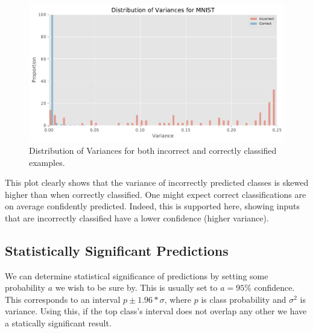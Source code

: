 \documentclass{article}
\begin{document}
\begin{figure}[hbt]
\centering
\includegraphics[width=\hsize]{figures/mnist/variances_combined.pdf}
\caption{Distribution of Variances for both incorrect and correctly classified examples.}
\label{fig:mnist-variances}
\end{figure}


This plot clearly shows that the variance of incorrectly predicted classes is skewed higher than when correctly classified. One might expect correct classifications are on average confidently predicted. Indeed, this is supported here, showing inputs that are incorrectly classified have a lower confidence (higher variance). 


\subsection{Statistically Significant Predictions}
We can determine statistical significance of predictions by setting some probability $a$ we wish to be sure by. This is usually set to $a=95\%$ confidence. This corresponds to an interval $p \pm 1.96*\sigma$, where $p$ is class probability and $\sigma^2$ is variance. Using this, if the top class's interval does not overlap any other we have a statically significant result.
\end{document}
